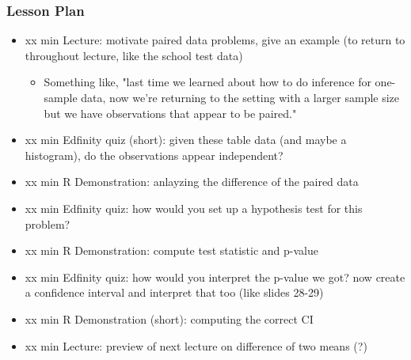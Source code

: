 \begin{frame}
    \frametitle{Lesson Plan}
    \begin{itemize}
        \item xx min Lecture: motivate paired data problems, give an example (to return to throughout lecture, like the school test data)
        \begin{itemize}
            \item Something like, "last time we learned about how to do inference for one-sample data, now we're returning to the setting with a larger sample size but we have observations that appear to be paired."
        \end{itemize}    
        \item xx min Edfinity quiz (short): given these table data (and maybe a histogram), do the observations appear independent?
        \item xx min R Demonstration: anlayzing the difference of the paired data 
        \item xx min Edfinity quiz: how would you set up a hypothesis test for this problem?
        \item xx min R Demonstration: compute test statistic and p-value 
        \item xx min Edfinity quiz: how would you interpret the p-value we got? now create a confidence interval and interpret that too (like slides 28-29)
        \item xx min R Demonstration (short): computing the correct CI
        \item xx min Lecture: preview of next lecture on difference of two means (?)
    \end{itemize}

\end{frame}
            
